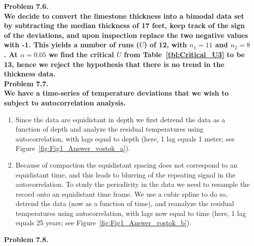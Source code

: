\noindent
\bf{Problem 7.6.} \\

We decide to convert the limestone thickness into a bimodal data set by subtracting the median
thickness of 17 feet, keep track of the sign of the deviations, and upon inspection replace the
two negative values with -1.  This yields a number of runs ($U$) of 12, with $n_1 = 11$ and $n_2 = 8$.
At $\alpha = 0.05$ we find the critical $U$ from Table~\ref{tbl:Critical_U3} to be 13, hence
we reject the hypothesis that there is no trend in the thickness data. \\

\noindent
\bf{Problem 7.7.}
\\

\noindent
We have a time-series of temperature deviations that we wish to subject to autocorrelation analysis.
\begin{enumerate}[label=\alph*)]
\item Since the data are equidistant in depth we first detrend the data as a function of depth and analyze the
residual temperatures using autocorrelation, with lags equal to depth (here, 1 lag equals 1 meter; see Figure~\ref{fig:Fig1_Answer_vostok_a}).
\item Because of compaction the equidistant spacing does not correspond to an equidistant time, and this leads to blurring of the
repeating signal in the autocorrelation. To study the periodicity in the
data we need to resample the record onto an equidistant time frame.  We use a cubic spline to do so,  detrend the data (now as a function of time), and reanalyze the
residual temperatures using autocorrelation, with lags now equal to time (here, 1 lag equals 25 years; see Figure~\ref{fig:Fig1_Answer_vostok_b}).
\end{enumerate}

\noindent
\bf{Problem 7.8.} \\

